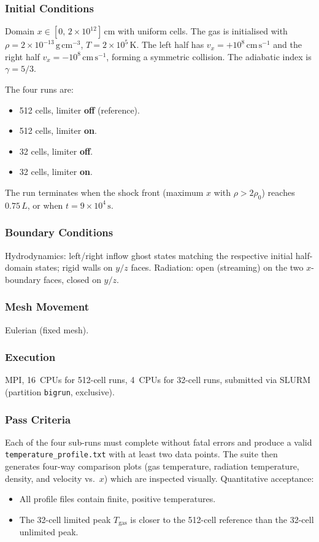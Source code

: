 \documentclass[11pt,a4paper]{article}
\begin{document}
\subsubsection*{Initial Conditions}
Domain $x \in [0,\,2\times10^{12}]\,\mathrm{cm}$ with uniform cells. The gas is initialised with $\rho = 2\times10^{-13}\,\mathrm{g\,cm^{-3}}$, $T = 2\times10^{5}\,\mathrm{K}$. The left half has $v_x = +10^8\,\mathrm{cm\,s^{-1}}$ and the right half $v_x = -10^8\,\mathrm{cm\,s^{-1}}$, forming a symmetric collision. The adiabatic index is $\gamma = 5/3$.

The four runs are:
\begin{itemize}
  \item 512 cells, limiter \textbf{off} (reference).
  \item 512 cells, limiter \textbf{on}.
  \item 32 cells, limiter \textbf{off}.
  \item 32 cells, limiter \textbf{on}.
\end{itemize}
The run terminates when the shock front (maximum $x$ with $\rho > 2\rho_0$) reaches $0.75\,L$, or when $t = 9\times10^4\,\mathrm{s}$.

\subsubsection*{Boundary Conditions}
Hydrodynamics: left/right inflow ghost states matching the respective initial half-domain states; rigid walls on $y/z$ faces. Radiation: open (streaming) on the two $x$-boundary faces, closed on $y/z$.

\subsubsection*{Mesh Movement}
Eulerian (fixed mesh).

\subsubsection*{Execution}
MPI, 16~CPUs for 512-cell runs, 4~CPUs for 32-cell runs, submitted via SLURM (partition \texttt{bigrun}, exclusive).

\subsubsection*{Pass Criteria}
Each of the four sub-runs must complete without fatal errors and produce a valid \texttt{temperature\_profile.txt} with at least two data points. The suite then generates four-way comparison plots (gas temperature, radiation temperature, density, and velocity vs.\ $x$) which are inspected visually. Quantitative acceptance:
\begin{itemize}
  \item All profile files contain finite, positive temperatures.
  \item The 32-cell limited peak $T_{\mathrm{gas}}$ is closer to the 512-cell reference than the 32-cell unlimited peak.
\end{itemize}
\end{document}
